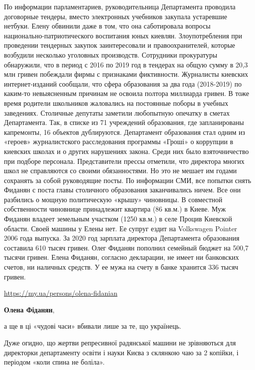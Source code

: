 \begin{itemize}
По информации парламентариев, руководительница Департамента проводила
договорные тендеры, вместо электронных учебников закупала устаревшие нетбуки.
Елену обвинили даже в том, что она саботировала вопросы
национально-патриотического воспитания юных киевлян. Злоупотребления при
проведении тендерных закупок заинтересовали и правоохранителей, которые
возбудили несколько уголовных производств. Сотрудники прокуратуры обнаружили,
что в период с 2016 по 2019 год в тендерах на общую сумму в 20,3 млн гривен
побеждали фирмы с признаками фиктивности. Журналисты киевских интернет-изданий
сообщали, что сфера образования за два года (2018-2019) по каким-то
невыясненным причинам не освоила полтора миллиарда гривен. В тоже время
родители школьников жаловались на постоянные поборы в учебных заведениях.
Столичные депутаты заметили любопытную опечатку в сметах Департамента. Так, в
списке из 71 учреждений образования, где запланированы капремонты, 16 объектов
дублируются. Департамент образования стал одним из «героев» журналистского
расследования программы «Гроші» о коррупции в киевских школах и о других
нарушениях закона. Среди них было взяточничество при подборе персонала.
Представители прессы отметили, что директора многих школ не справляются со
своими обязанностями. Но это не мешает им годами сохранять за собой руководящие
посты. По информации СМИ, все попытки снять Фиданян с поста главы столичного
образования заканчивались ничем. Все они разбились о мощную политическую
«крышу» чиновницы. В совместной собственности чиновнице принадлежит квартира
(86 кв.м.) в Киеве. Муж Фиданян владеет земельным участком (1250 кв.м.) в селе
Процив Киевской области. Своей машины у Елены нет. Ее супруг ездит на
Volkswagen Pointer 2006 года выпуска. За 2020 год зарплата директора
Департамента образования составила 610 тысяч гривен. Олег Фиданян пополнил
семейный бюджет на 500,7 тысячи гривен. Елена Фиданян, согласно декларации, не
имеет ни банковских счетов, ни наличных средств. У ее мужа на счету в банке
хранится 336 тысяч гривен.

\url{https://my.ua/persons/olena-fidanian}

 
\textbf{Олена Фіданян}, 

а ще в ці «чудові часи» вбивали лише за те, що українець.

Дуже огидно, що жертви репресивної радянської машини не зрівняються для
директорки департаменту освіти і науки Києва з склянкою чаю за 2 копійки, і
періодом «коли спина не боліла».


\end{itemize}
